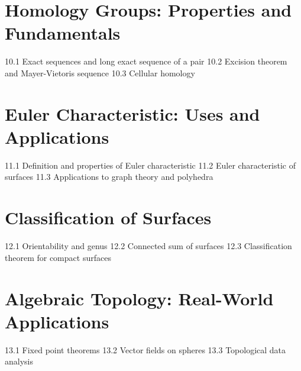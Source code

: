 \section{Homology Groups: Properties and Fundamentals}
10.1 Exact sequences and long exact sequence of a pair
10.2 Excision theorem and Mayer-Vietoris sequence
10.3 Cellular homology
\section{Euler Characteristic: Uses and Applications}
11.1 Definition and properties of Euler characteristic
11.2 Euler characteristic of surfaces
11.3 Applications to graph theory and polyhedra
\section{Classification of Surfaces}
12.1 Orientability and genus
12.2 Connected sum of surfaces
12.3 Classification theorem for compact surfaces
\section{Algebraic Topology: Real-World Applications}
13.1 Fixed point theorems
13.2 Vector fields on spheres
13.3 Topological data analysis
